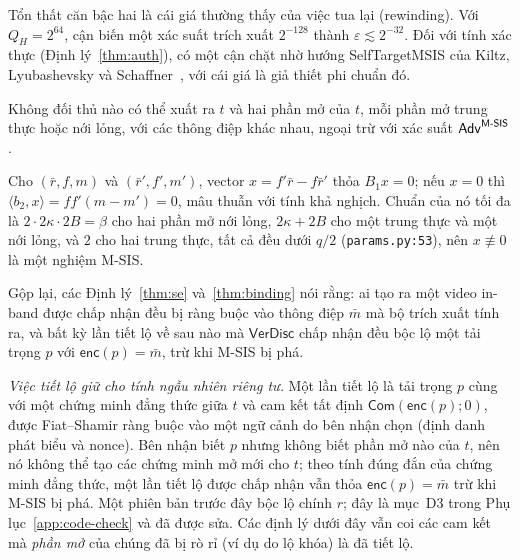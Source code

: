 Tổn thất căn bậc hai là cái giá thường thấy của việc tua lại (rewinding). Với
$Q_H=2^{64}$, cận biến một xác suất trích xuất $2^{-128}$ thành $\varepsilon
\lesssim2^{-32}$. Đối với tính xác thực (Định lý~\ref{thm:auth}), có một cận
chặt nhờ hướng SelfTargetMSIS của Kiltz, Lyubashevsky và
Schaffner~\cite{ref:kls18}, với cái giá là giả thiết phi chuẩn đó.

\begin{theorem}
\label{thm:binding}
Không đối thủ nào có thể xuất ra $t$ và hai phần mở của $t$, mỗi phần mở trung
thực hoặc nới lỏng, với các thông điệp khác nhau, ngoại trừ với xác suất
$\mathsf{Adv}^{\textsf{M-SIS}}$.
\end{theorem}
\noindent
Cho $(\bar r,f,m)$ và $(\bar r',f',m')$, vector
$x=f'\bar r-f\bar r'$ thỏa $B_1x=0$; nếu $x=0$ thì
$\langle b_2,x\rangle=ff'(m-m')=0$, mâu thuẫn với tính khả nghịch. Chuẩn của nó
tối đa là $2\cdot2\kappa\cdot2B=\beta$ cho hai phần mở nới lỏng, $2\kappa+2B$
cho một trung thực và một nới lỏng, và $2$ cho hai trung thực, tất cả đều dưới
$q/2$ (\texttt{params.py:53}), nên $x\not\equiv0$ là một nghiệm M-SIS.

\noindent
Gộp lại, các Định lý~\ref{thm:se} và~\ref{thm:binding} nói rằng: ai tạo ra một
video in-band được chấp nhận đều bị ràng buộc vào thông điệp $\bar m$ mà bộ
trích xuất tính ra, và bất kỳ lần tiết lộ về sau nào mà $\mathsf{VerDisc}$ chấp
nhận đều bộc lộ một tải trọng $p$ với $\mathsf{enc}(p)=\bar m$, trừ khi M-SIS
bị phá.

\emph{Việc tiết lộ giữ cho tính ngẫu nhiên riêng tư.} Một lần tiết lộ là tải
trọng $p$ cùng với một chứng minh đẳng thức giữa $t$ và cam kết tất định
$\mathsf{Com}(\mathsf{enc}(p);0)$, được Fiat--Shamir ràng buộc vào một ngữ cảnh
do bên nhận chọn (định danh phát biểu và nonce). Bên nhận biết $p$ nhưng không
biết phần mở nào của $t$, nên nó không thể tạo các chứng minh mở mới cho $t$;
theo tính đúng đắn của chứng minh đẳng thức, một lần tiết lộ được chấp nhận vẫn
thỏa $\mathsf{enc}(p)=\bar m$ trừ khi M-SIS bị phá. Một phiên bản trước đây bộc
lộ chính $r$; đây là mục~D3 trong Phụ lục~\ref{app:code-check} và đã được sửa.
Các định lý dưới đây vẫn coi các cam kết mà \emph{phần mở} của chúng đã bị rò rỉ
(ví dụ do lộ khóa) là đã tiết lộ.

